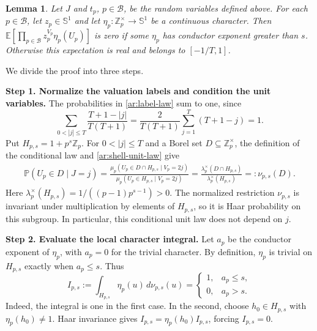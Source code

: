 \documentclass[twoside]{aomart}
\makeatletter
\theoremstyle{paperplain}
\newtheorem{lemma}[theorem]{Lemma}
\theoremstyle{paperdefinition}
\renewenvironment{proof}[1][\proofname]{\par\pushQED{\qed}%
  \normalfont\topsep6\p@\@plus3\p@\relax\trivlist
  \item[\hskip\labelsep\itshape #1\@addpunct{.}]\ignorespaces
}{\popQED\endtrivlist\@endpefalse}
\newcommand{\E}{\mathbb E}
\newcommand{\Z}{\mathbb Z}
\newcommand{\Pp}{\mathbb P}
\numberwithin{equation}{section}
\makeatother
\begin{document}
\begin{lemma}
\label{ar:Fejer}
Let $J$ and $t_p$, $p\in\mathcal B$, be the random variables
defined above. For each $p\in\mathcal B$, let
$z_p\in\mathbb S^1$ and let $\eta_p:\Z_p^\times\to\mathbb S^1$
be a continuous character. Then
$\E[\prod_{p\in\mathcal B}z_p^{V_p}\eta_p(U_p)]$ is zero
if some $\eta_p$ has conductor exponent greater than $s$.
Otherwise this expectation is real and belongs to $[-1/T,1]$.
\end{lemma}
\begin{proof}
We divide the proof into three steps.

\medskip
\noindent\textbf{Step 1. Normalize the valuation labels and condition the unit variables.}
The probabilities in \eqref{ar:label-law} sum to one, since
\begin{equation}
 \sum_{0<|j|\le T}\frac{T+1-|j|}{T(T+1)}
 =\frac2{T(T+1)}\sum_{j=1}^T(T+1-j)=1.
 \label{ar:label-law-normalization}
\end{equation}
Put $H_{p,s}=1+p^s\Z_p$. For $0<|j|\le T$ and a Borel set
$D\subseteq\Z_p^\times$, the definition of the conditional law
and \eqref{ar:shell-unit-law} give
\begin{equation*}
 \begin{aligned}
 \Pp(U_p\in D\mid J=j)
 =\frac{\mu_p(U_p\in D\cap H_{p,s}\mid V_p=2j)}
         {\mu_p(U_p\in H_{p,s}\mid V_p=2j)}
 =\frac{\lambda_p^\times(D\cap H_{p,s})}
         {\lambda_p^\times(H_{p,s})}
 =:\nu_{p,s}(D).
 \end{aligned}
\end{equation*}
Here $\lambda_p^\times(H_{p,s})=1/((p-1)p^{s-1})>0$.
The normalized restriction $\nu_{p,s}$ is invariant under
multiplication by elements of $H_{p,s}$, so it is Haar probability
on this subgroup. In particular, this conditional unit law
does not depend on $j$.

\medskip
\noindent\textbf{Step 2. Evaluate the local character integral.}
Let $a_p$ be the conductor exponent of $\eta_p$, with $a_p=0$
for the trivial character. By definition, $\eta_p$ is trivial
on $H_{p,s}$ exactly when $a_p\le s$. Thus
\begin{equation*}
 I_{p,s}:=\int_{H_{p,s}}\eta_p(u)\,d\nu_{p,s}(u)
 =\begin{cases}1,&a_p\le s,\\0,&a_p>s.
 \end{cases}
\end{equation*}
Indeed, the integral is one in the first case. In the second,
choose $h_0\in H_{p,s}$ with $\eta_p(h_0)\ne1$.
Haar invariance gives $I_{p,s}=\eta_p(h_0)I_{p,s}$, forcing
$I_{p,s}=0$.


\end{proof}
\end{document}
